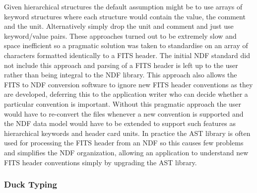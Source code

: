 \documentclass[final,authoryear,5p,times,twocolumn]{elsarticle}
\begin{document}
Given hierarchical structures the default assumption might be to use
arrays of keyword structures where each structure would contain the
value, the comment and the unit. Alternatively simply drop the unit
and comment and just use keyword/value pairs. These approaches turned
out to be extremely slow and space inefficient so a pragmatic solution
was taken to standardise on an array of characters formatted
identically to a FITS header. The initial NDF standard did not include
this approach and parsing of a FITS header is left up to the user
rather than being integral to the NDF library. This approach also allows the FITS to NDF conversion
software to ignore new FITS header conventions as they are developed,
deferring this to the application writer who can decide whether a
particular convention is important. Without this pragmatic approach
the user would have to re-convert the files whenever a new convention
is supported and the NDF data model would have to be extended to
support such features as hierarchical keywords and header card units.
In practice the AST
library \citep{1998ASPC..145...41W} is often used for processing the FITS
header from an NDF so this causes few problems and simplifies the NDF
organization, allowing an application to understand new FITS header
conventions simply by upgrading the AST library.

\subsubsection{Duck Typing}
\end{document}
